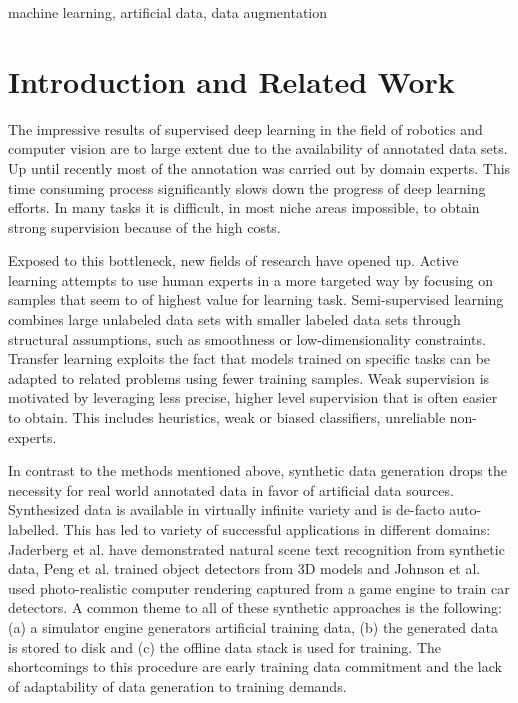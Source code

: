 \documentclass[conference]{IEEEtran}
\begin{document}
\begin{IEEEkeywords}
machine learning, artificial data, data augmentation
\end{IEEEkeywords}

\section{Introduction and Related Work}
The impressive results of supervised deep learning in the field of robotics and computer vision are to large extent due to the availability of annotated data sets. Up until recently most of the annotation was carried out by domain experts. This time consuming process significantly slows down the progress of deep learning efforts. In many tasks it is difficult, in most niche areas impossible, to obtain strong supervision because of the high costs.

Exposed to this bottleneck, new fields of research have opened up. Active learning \cite{druck2009active, settles2012active, cakmak2012designing} attempts to use human experts in a more targeted way by focusing on samples that seem to of highest value for learning task. Semi-supervised learning \cite{chapelle2009semi, salimans2016improved, zhu2006semi} combines large unlabeled data sets with smaller labeled data sets through structural assumptions, such as smoothness or low-dimensionality constraints. Transfer learning \cite{pratt1993discriminability, ventura2007theoretical, pan2010survey} exploits the fact that models trained on specific tasks can be adapted to related problems using fewer training samples. Weak supervision \cite{ratner2016data, zhou2017brief} is motivated by leveraging less precise, higher level supervision that is often easier to obtain. This includes heuristics, weak or biased classifiers, unreliable non-experts. 


In contrast to the methods mentioned above, synthetic data generation drops the necessity for real world annotated data in favor of artificial data sources. Synthesized data is available in virtually infinite variety and is de-facto auto-labelled. This has led to variety of successful applications in different domains: Jaderberg et al. \cite{jaderberg2014synthetic} have demonstrated natural scene text recognition from synthetic data, Peng et al. \cite{peng2015learning} trained object detectors from 3D models and Johnson et al. \cite{2017_Johnson_DrivingInTheMatrix} used photo-realistic computer rendering captured from a game engine to train car detectors. A common theme to all of these synthetic approaches is the following: (a) a simulator engine generators artificial training data, (b) the generated data is stored to disk and (c) the offline data stack is used for training. The shortcomings to this procedure are early training data commitment and the lack of adaptability of data generation to training demands.
\end{document}
